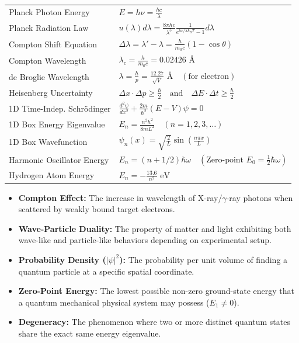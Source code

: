 \documentclass[12pt,a4paper]{article}
\renewcommand{\arraystretch}{1.45}
\begin{document}
\begin{tcolorbox}[formulabox, title={\textbf{Key Formulas and Metrics at a Glance}}]
\renewcommand{\arraystretch}{1.35}
\begin{tabularx}{\linewidth}{B{5.0cm} X}
Planck Photon Energy & $E = h \nu = \frac{hc}{\lambda}$ \\[4pt]
Planck Radiation Law & $u(\lambda)d\lambda = \frac{8\pi h c}{\lambda^5} \frac{1}{e^{hc/\lambda k_B T} - 1} d\lambda$ \\[4pt]
Compton Shift Equation & $\Delta\lambda = \lambda' - \lambda = \frac{h}{m_0 c}(1 - \cos\theta)$ \\[4pt]
Compton Wavelength & $\lambda_c = \frac{h}{m_0 c} = 0.02426\text{ \AA}$ \\[4pt]
de Broglie Wavelength & $\lambda = \frac{h}{p} = \frac{12.27}{\sqrt{V}}\text{ \AA} \quad (\text{for electron})$ \\[4pt]
Heisenberg Uncertainty & $\Delta x \cdot \Delta p \ge \frac{\hbar}{2} \quad \text{and} \quad \Delta E \cdot \Delta t \ge \frac{\hbar}{2}$ \\[4pt]
1D Time-Indep. Schrödinger & $\frac{d^2\psi}{dx^2} + \frac{2m}{\hbar^2}(E - V)\psi = 0$ \\[4pt]
1D Box Energy Eigenvalue & $E_n = \frac{n^2 h^2}{8 m L^2} \quad (n = 1, 2, 3, \ldots)$ \\[4pt]
1D Box Wavefunction & $\psi_n(x) = \sqrt{\frac{2}{L}} \sin\left(\frac{n\pi x}{L}\right)$ \\[4pt]
Harmonic Oscillator Energy & $E_n = (n + 1/2)\hbar \omega \quad (\text{Zero-point } E_0 = \frac{1}{2}\hbar\omega)$ \\[4pt]
Hydrogen Atom Energy & $E_n = -\frac{13.6}{n^2}\text{ eV}$ \\[4pt]
\end{tabularx}
\end{tcolorbox}

\begin{tcolorbox}[defbox, title={\textbf{One-Line Definitions}}]
\begin{itemize}[leftmargin=*, itemsep=2pt]
  \item \textbf{Compton Effect:} The increase in wavelength of X-ray/$\gamma$-ray photons when scattered by weakly bound target electrons.
  \item \textbf{Wave-Particle Duality:} The property of matter and light exhibiting both wave-like and particle-like behaviors depending on experimental setup.
  \item \textbf{Probability Density ($|\psi|^2$):} The probability per unit volume of finding a quantum particle at a specific spatial coordinate.
  \item \textbf{Zero-Point Energy:} The lowest possible non-zero ground-state energy that a quantum mechanical physical system may possess ($E_1 \neq 0$).
  \item \textbf{Degeneracy:} The phenomenon where two or more distinct quantum states share the exact same energy eigenvalue.
\end{itemize}
\end{tcolorbox}
\end{document}
